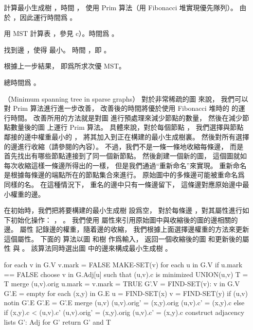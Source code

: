 \startigNum[n]
\item 計算最小生成樹 ，時間 ，
使用 Prim 算法（用 Fibonacci 堆實現優先隊列）。
由於 ，因此運行時間爲 。

\item 用 MST 計算表 \m{\max}，參見 c）。時間爲 。

\item 找到邊 ，使得  最小。
時間 ，即 。

\item 根據上一步結果，  即爲所求次優 MST。
\stopigNum

總時間爲 。
\stopANSWER

\stopPROBLEM

\startPROBLEM[problem:23-2]
（Minimum spanning tree in sparse graphs）
對於非常稀疏的圖  來說，
我們可以對 Prim 算法進行進一步改善，
改善後的時間將優於使用 Fibonacci 堆時的  的運行時間。
改善所用的方法就是對圖  進行預處理來減少節點的數量，
然後在減少節點數量後的圖  上運行 Prim 算法。
具體來說，對於每個節點 ，
我們選擇與節點  鄰接的邊中權重最小的 ，
將其加入到正在構建的最小生成樹裏。
然後對所有選擇的邊進行收縮（請參閱的內容）。
不過，我們不是一條一條地收縮每條邊，
而是首先找出有哪些節點連接到了同一個新節點。
然後創建一個新的圖，
這個圖就如每次收縮這樣一條邊所得出的一樣，
但是我們通過“重新命名”來實現。
重新命名是根據每條邊的端點所在的節點集合來進行。
原始圖中的多條邊可能被重命名爲同樣的名。
在這種情況下，
重名的邊中只有一條邊留下，
這條邊對應原始邊中最小權重的邊。

在初始時，我們把將要構建的最小生成樹  設爲空，
對於每條邊 ，對其屬性進行如下初始化操作：
 ， 。
我們使用  屬性來引用原始圖中與收縮後的圖的邊相關的邊。
屬性  記錄邊的權重，隨着邊的收縮，
我們根據上面選擇邊權重的方法來更新這個屬性。
下面的  算法以圖  和樹  作爲輸入，
返回一個收縮後的圖  和更新後的屬性  與 。
該算法同時選出圖  中的邊來構成最小生成樹 。

\startCLRS
for each v in G.V
	v.mark = FALSE
	MAKE-SET(v)
for each u in G.V
	if u.mark == FALSE
		choose v in G.Adj[u] such that (u,v).c is minimized
		UNION(u,v)
		T = T merge (u,v).orig
		u.mark = v.mark = TRUE
G'.V = {FIND-SET(v): v in G.V}
G'.E = empty
for each (x,y) in G.E
	u = FIND-SET(x)
	v = FIND-SET(y)
	if (u,v) notin G'.E
		G'.E = G'.E merge {(u,v)}
		(u,v).orig' = (x,y).orig
		(u,v).c' = (x,y).c
	else if (x,y).c < (u,v).c'
		(u,v).orig' = (x,y).orig
		(u,v).c' = (x,y).c
construct adjacency lists G': Adj for G'
return G' and T
\stopCLRS

